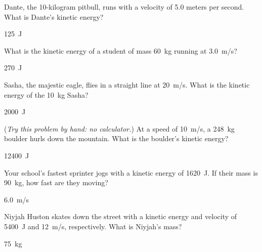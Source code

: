 \documentclass[../main-physics-problems.tex]{subfiles}
\begin{document}
\begin{questions}

\question \label{taHSMX}
Dante, the 10-kilogram pitbull, runs with a velocity of 5.0 meters per second. What is Dante's kinetic energy?

\begin{solution}
\SI{125}{J}
\end{solution}

\question \label{QRI2H9}
What is the kinetic energy of a student of mass \SI{60}{kg} running at \SI{3.0}{m/s}?

\begin{solution}
\SI{270}{J}
\end{solution}


\question \label{ixc46e}
Sasha, the majestic eagle, flies in a straight line at \SI{20}{m/s}. What is the kinetic energy of the \SI{10}{kg} Sasha? 

\begin{solution}
\SI{2000}{J}
\end{solution}


\question \label{dguWEr}
(\textit{Try this problem by hand: no calculator.}) At a speed of \SI{10}{m/s}, a \SI{248}{kg} boulder hurls down the mountain. What is the boulder's kinetic energy?

\begin{solution}
\SI{12400}{J}
\end{solution}

\question \label{rUr2P8}
Your school's fastest sprinter jogs with a kinetic energy of \SI{1620}{J}. If their mass is \SI{90}{kg}, how fast are they moving?

\begin{solution}
\SI{6.0}{m/s}
\end{solution}

\question \label{2rrR9W}
Niyjah Huston skates down the street with a kinetic energy and velocity of \SI{5400}{J} and \SI{12}{m/s}, respectively. What is Niyjah's mass?

\begin{solution}
\SI{75}{kg}
\end{solution}


\end{questions}
\end{document}
